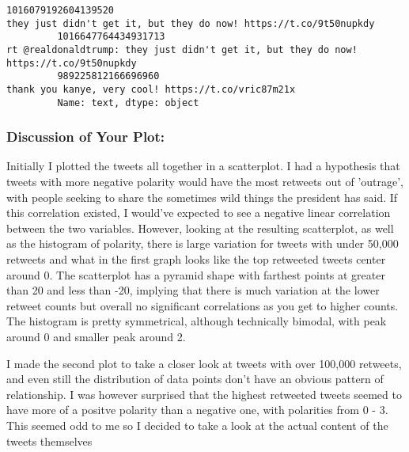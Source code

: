 \documentclass[11pt]{article}
\begin{document}
\begin{Verbatim}[commandchars=\\\{\}]
         1016079192604139520                                                                                                                                                                                                                          they just didn't get it, but they do now! https://t.co/9t50nupkdy
         1016647764434931713                                                                                                                                                                                                     rt @realdonaldtrump: they just didn't get it, but they do now! https://t.co/9t50nupkdy
         989225812166696960                                                                                                                                                                                                                                         thank you kanye, very cool! https://t.co/vric87m21x
         Name: text, dtype: object
\end{Verbatim}
            
    \subsubsection{Discussion of Your Plot:}\label{discussion-of-your-plot}

    Initially I plotted the tweets all together in a scatterplot. I had a
hypothesis that tweets with more negative polarity would have the most
retweets out of 'outrage', with people seeking to share the sometimes
wild things the president has said. If this correlation existed, I
would've expected to see a negative linear correlation between the two
variables. However, looking at the resulting scatterplot, as well as the
histogram of polarity, there is large variation for tweets with under
50,000 retweets and what in the first graph looks like the top retweeted
tweets center around 0. The scatterplot has a pyramid shape with
farthest points at greater than 20 and less than -20, implying that
there is much variation at the lower retweet counts but overall no
significant correlations as you get to higher counts. The histogram is
pretty symmetrical, although technically bimodal, with peak around 0 and
smaller peak around 2.

I made the second plot to take a closer look at tweets with over 100,000
retweets, and even still the distribution of data points don't have an
obvious pattern of relationship. I was however surprised that the
highest retweeted tweets seemed to have more of a positve polarity than
a negative one, with polarities from 0 - 3. This seemed odd to me so I
decided to take a look at the actual content of the tweets themselves
\end{document}
